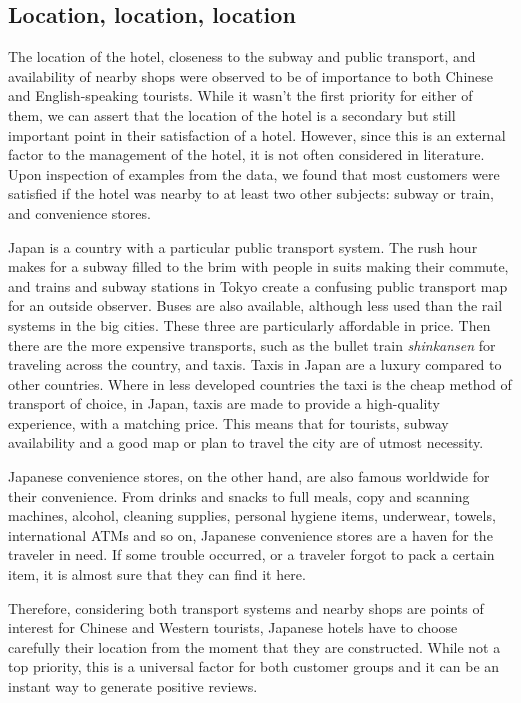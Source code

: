 \subsection{Location, location, location}\label{disc:location}

The location of the hotel, closeness to the subway and public transport, and availability of nearby shops were observed to be of importance to both Chinese and English-speaking tourists. While it wasn't the first priority for either of them, we can assert that the location of the hotel is a secondary but still important point in their satisfaction of a hotel. However, since this is an external factor to the management of the hotel, it is not often considered in literature. Upon inspection of examples from the data, we found that most customers were satisfied if the hotel was nearby to at least two other subjects: subway or train, and convenience stores. 

Japan is a country with a particular public transport system. The rush hour makes for a subway filled to the brim with people in suits making their commute, and trains and subway stations in Tokyo create a confusing public transport map for an outside observer. Buses are also available, although less used than the rail systems in the big cities. These three are particularly affordable in price. Then there are the more expensive transports, such as the bullet train \textit{shinkansen} for traveling across the country, and taxis. Taxis in Japan are a luxury compared to other countries. Where in less developed countries the taxi is the cheap method of transport of choice, in Japan, taxis are made to provide a high-quality experience, with a matching price. This means that for tourists, subway availability and a good map or plan to travel the city are of utmost necessity.

Japanese convenience stores, on the other hand, are also famous worldwide for their convenience. From drinks and snacks to full meals, copy and scanning machines, alcohol, cleaning supplies, personal hygiene items, underwear, towels, international ATMs and so on, Japanese convenience stores are a haven for the traveler in need. If some trouble occurred, or a traveler forgot to pack a certain item, it is almost sure that they can find it here.

Therefore, considering both transport systems and nearby shops are points of interest for Chinese and Western tourists, Japanese hotels have to choose carefully their location from the moment that they are constructed. While not a top priority, this is a universal factor for both customer groups and it can be an instant way to generate positive reviews.


